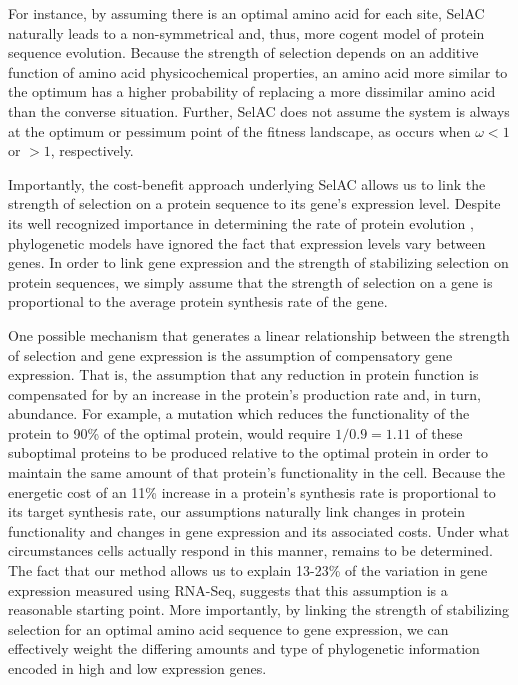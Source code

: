 \documentclass[12pt,letterpaper,fleqn]{article}
\newcommand{\PC}{physicochemical\xspace}
\newcommand{\selac}{SelAC\xspace}
\begin{document}
For instance, by assuming there is an optimal amino acid for each site, \selac naturally leads to a non-symmetrical and, thus, more cogent model of protein sequence evolution.
Because the strength of selection depends on an additive function of amino acid \PC properties, an amino acid more similar to the optimum has a higher probability of replacing a more dissimilar amino acid than the converse situation.
Further, \selac does not assume the system is always at the optimum or pessimum point of the fitness landscape, as occurs when $\omega < 1$ or $>1$, respectively.

Importantly, the cost-benefit approach underlying \selac allows us to link the strength of selection on a protein sequence to its gene's expression level.
Despite its well recognized importance in determining the rate of protein evolution \citep[e.g.][]{DrummondEtAl2005,DrummondEtAl2006a}, phylogenetic models have ignored the fact that expression levels vary between genes.
In order to link gene expression and the strength of stabilizing selection on protein sequences, we simply assume that the strength of selection on a gene is proportional to the average protein synthesis rate of the gene.

One possible mechanism that generates a linear relationship between the strength of selection and gene expression is the assumption of compensatory gene expression.
That is, the assumption that any reduction in protein function is compensated for by an increase in the protein's production rate and, in turn, abundance.
For example, a mutation which reduces the functionality of the protein to 90\% of the optimal protein, would require $1/0.9 = 1.11$ of these suboptimal proteins to be produced relative to the optimal protein in order to maintain the same amount of that protein's functionality in the cell.
Because the energetic cost of an 11\% increase in a protein's synthesis rate is proportional to its target synthesis rate, our assumptions naturally link changes in protein functionality and changes in gene expression and its associated costs.
Under what circumstances cells actually respond in this manner, remains to be determined.
The fact that our method allows us to explain 13-23\% of the variation in gene expression measured using RNA-Seq, suggests that this assumption is a reasonable starting point.
More importantly, by linking the strength of stabilizing selection for an optimal amino acid sequence to gene expression, we can effectively weight the differing amounts and type of phylogenetic information encoded in high and low expression genes.
\end{document}
